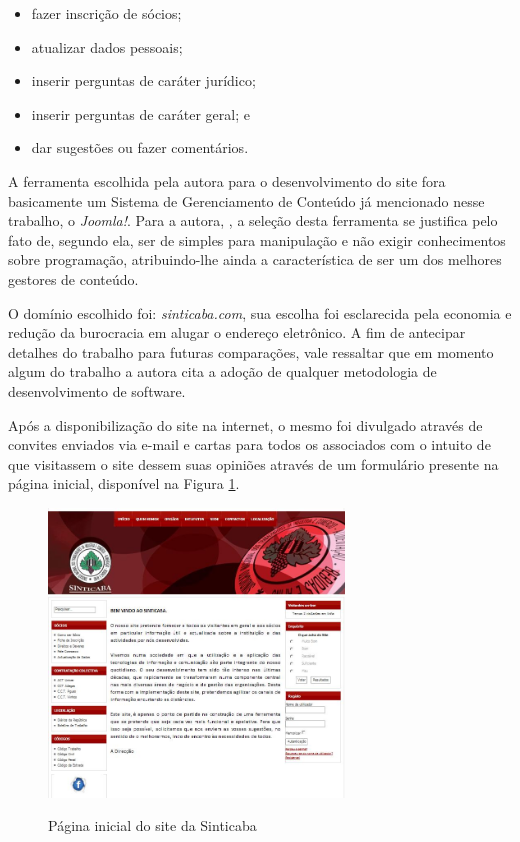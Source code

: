 \begin{itemize}
 \item fazer inscrição de sócios;
 \item atualizar dados pessoais;
 \item inserir perguntas de caráter jurídico;
 \item inserir perguntas de caráter geral; e
 \item dar sugestões ou fazer comentários.
\end{itemize}

A ferramenta escolhida pela autora para o desenvolvimento do site fora basicamente um Sistema de Gerenciamento de Conteúdo já mencionado nesse trabalho, o \textit{Joomla!}. Para a autora, , a seleção desta ferramenta se justifica pelo fato de, segundo ela, ser de simples para manipulação e não exigir conhecimentos sobre programação, atribuindo-lhe ainda a característica de ser um dos melhores gestores de conteúdo.

O domínio escolhido foi: \textit{sinticaba.com}, sua escolha foi esclarecida pela economia e redução da burocracia em alugar o endereço eletrônico. A fim de antecipar detalhes do trabalho para futuras comparações, vale ressaltar que em momento algum do trabalho a autora cita a adoção de qualquer metodologia de desenvolvimento de software.

Após a disponibilização do site na internet, o mesmo foi divulgado através de convites enviados via e-mail e cartas para todos os associados com o intuito de que visitassem o site dessem suas opiniões através de um formulário presente na página inicial, disponível na Figura \ref{pagina-inicial-sindicato}.

\begin{figure}[htb]
 \centering
 \caption{Página inicial do site da Sinticaba}
 \includegraphics[width=0.7\textwidth]{figuras/pInicial-Sindicato}
 \label{pagina-inicial-sindicato}
\end{figure}


